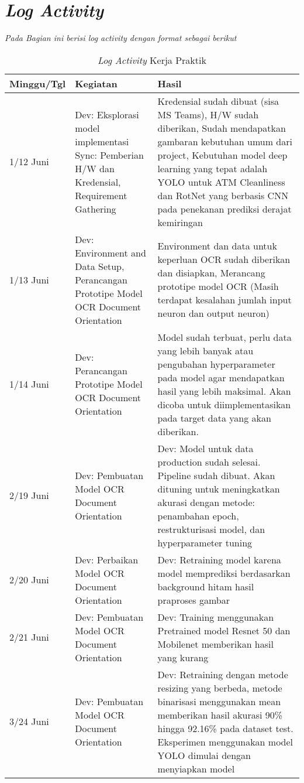 \chapter{\textit{Log Activity}\label{appendix:B}}
\textit{Pada Bagian ini berisi log activity dengan format sebagai berikut}
    \begin{longtable}{|p{5em}|p{10em}|p{15em}|}
    \caption{\textit{Log Activity} Kerja Praktik}\\
    \hline
        \centering Minggu/Tgl & \centering Kegiatan & \centering Hasil \tabularnewline \hline
        1/12 Juni & Dev: Eksplorasi model implementasi \newline 
Sync: Pemberian H/W dan Kredensial, Requirement Gathering & Kredensial sudah dibuat (sisa MS Teams), H/W sudah diberikan, Sudah mendapatkan gambaran kebutuhan umum dari project, Kebutuhan model deep learning yang tepat adalah YOLO untuk ATM Cleanliness dan RotNet yang berbasis CNN pada penekanan prediksi derajat kemiringan  \\ \hline
        1/13 Juni & Dev: Environment and Data Setup, Perancangan Prototipe Model OCR Document Orientation & Environment dan data untuk keperluan OCR sudah diberikan dan disiapkan, Merancang prototipe model OCR (Masih terdapat kesalahan jumlah input neuron dan output neuron) \\ \hline
        1/14 Juni & Dev: Perancangan Prototipe Model OCR Document Orientation & Model sudah terbuat, perlu data yang lebih banyak atau pengubahan hyperparameter pada model agar mendapatkan hasil yang lebih maksimal. Akan dicoba untuk diimplementasikan pada target data yang akan diberikan. \\ \hline
        2/19 Juni & Dev: Pembuatan Model OCR Document Orientation & Dev: Model untuk data production sudah selesai. Pipeline sudah dibuat. Akan dituning untuk meningkatkan akurasi dengan metode: penambahan epoch, restrukturisasi model, dan hyperparameter tuning \\ \hline
        2/20 Juni & Dev: Perbaikan Model OCR Document Orientation & Dev: Retraining model karena model memprediksi berdasarkan background hitam hasil praproses gambar \\ \hline
        2/21 Juni & Dev: Pembuatan Model OCR Document Orientation & Dev: Training menggunakan Pretrained model Resnet 50 dan Mobilenet memberikan hasil yang kurang \\ \hline
        3/24 Juni & Dev: Pembuatan Model OCR Document Orientation & Dev: Retraining dengan metode resizing yang berbeda, metode binarisasi menggunakan mean memberikan hasil akurasi 90\% hingga 92.16\% pada dataset test. Eksperimen menggunakan model YOLO dimulai dengan menyiapkan model \\ \hline

\end{longtable}
